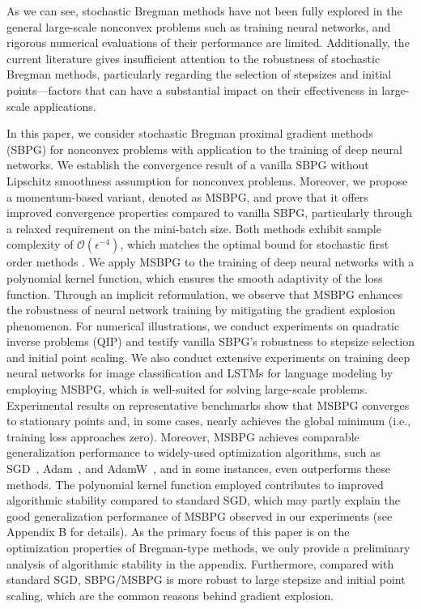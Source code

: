 \documentclass[twoside,11pt]{article}
\begin{document}
As we can see, stochastic Bregman methods have not been fully explored in the general large-scale nonconvex problems such as training neural networks, and rigorous numerical evaluations of their performance are limited. Additionally, the current literature gives insufficient attention to the robustness of stochastic Bregman methods, particularly regarding the selection of stepsizes and initial points—factors that can have a substantial impact on their effectiveness in large-scale applications.

In this paper, we consider stochastic Bregman proximal gradient methods (SBPG) for nonconvex problems with application to the training of deep neural networks. We establish the convergence result of a vanilla SBPG without Lipschitz smoothness assumption for nonconvex problems. {Moreover, we propose a momentum-based variant, denoted as MSBPG, and prove that it offers improved convergence properties compared to vanilla SBPG, particularly through a relaxed requirement on the mini-batch size. Both methods exhibit sample complexity of $\mathcal{O}(\epsilon^{-4})$, which matches the optimal bound for stochastic first order methods \citep{arjevani2023lower}.} We apply MSBPG to the training of deep neural networks with a polynomial kernel function, which ensures the smooth adaptivity of the loss function. {Through an implicit reformulation, we observe that MSBPG enhances the robustness of neural network training by mitigating the gradient explosion phenomenon. For numerical illustrations, we conduct experiments on quadratic inverse problems (QIP) and testify vanilla SBPG's robustness to stepsize selection and initial point scaling. We also conduct extensive experiments on training deep neural networks for image classification and LSTMs for language modeling by employing MSBPG, which is well-suited for solving large-scale problems. Experimental results on representative benchmarks show that MSBPG converges to stationary points and, in some cases, nearly achieves the global minimum (i.e., training loss approaches zero). Moreover, MSBPG achieves comparable generalization performance to widely-used optimization algorithms, such as SGD~\citep{robbins1951stochastic}, Adam~\citep{kingma2014adam}, and AdamW~\citep{loshchilov2017decoupled}, and in some instances, even outperforms these methods. The polynomial kernel function employed contributes to improved algorithmic stability compared to standard SGD, which may partly explain the good generalization performance of MSBPG observed in our experiments (see Appendix B for details). As the primary focus of this paper is on the optimization properties of Bregman-type methods, we only provide a preliminary analysis of algorithmic stability 
in the appendix.} Furthermore, compared with standard SGD, SBPG/MSBPG is more robust to large stepsize and initial point scaling, which are the common reasons behind gradient explosion. 
\end{document}
